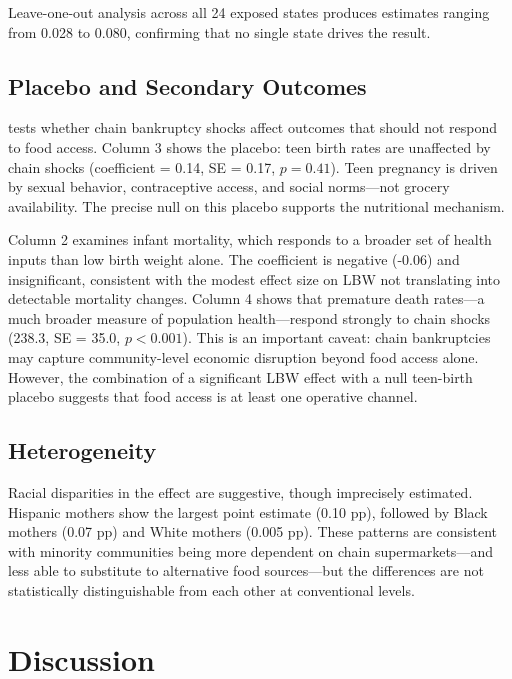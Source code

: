 \documentclass[12pt]{article}
\begin{document}
Leave-one-out analysis across all 24 exposed states produces estimates ranging from 0.028 to 0.080, confirming that no single state drives the result.



\subsection{Placebo and Secondary Outcomes}

 tests whether chain bankruptcy shocks affect outcomes that should not respond to food access. Column 3 shows the placebo: teen birth rates are unaffected by chain shocks (coefficient = 0.14, SE = 0.17, $p = 0.41$). Teen pregnancy is driven by sexual behavior, contraceptive access, and social norms---not grocery availability. The precise null on this placebo supports the nutritional mechanism.

Column 2 examines infant mortality, which responds to a broader set of health inputs than low birth weight alone. The coefficient is negative (-0.06) and insignificant, consistent with the modest effect size on LBW not translating into detectable mortality changes. Column 4 shows that premature death rates---a much broader measure of population health---respond strongly to chain shocks (238.3, SE = 35.0, $p < 0.001$). This is an important caveat: chain bankruptcies may capture community-level economic disruption beyond food access alone. However, the combination of a significant LBW effect with a null teen-birth placebo suggests that food access is at least one operative channel.



\subsection{Heterogeneity}

Racial disparities in the effect are suggestive, though imprecisely estimated. Hispanic mothers show the largest point estimate (0.10 pp), followed by Black mothers (0.07 pp) and White mothers (0.005 pp). These patterns are consistent with minority communities being more dependent on chain supermarkets---and less able to substitute to alternative food sources---but the differences are not statistically distinguishable from each other at conventional levels.

\section{Discussion}
\end{document}
